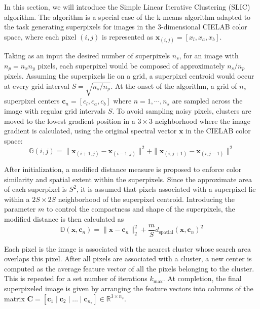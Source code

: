 In this section, we will introduce the Simple Linear Iterative Clustering (SLIC) algorithm. The algorithm is a special case of the k-means algorithm adapted to the task generating superpixels for images in the 3-dimensional CIELAB color space, where each pixel $(i,j)$ is represented as $\mathbf{x}_{(i,j)} = [x_l, x_a, x_b]$.

Taking as an input the desired number of superpixels $n_s$, for an image with $n_p = n_x n_y$ pixels, each superpixel would be composed of approximately $n_s / n_p$ pixels. Assuming the superpixels lie on a grid, a superpixel centroid would occur at every grid interval $S = \sqrt{n_s/n_p}$. At the onset of the algorithm, a grid of $n_s$ superpixel centers $\mathbf{c}_n = [c_{l}, c_{a}, c_{b}]$ where $n = 1, \cdots, n_s$ are sampled across the image with regular grid intervals $S$. To avoid sampling noisy pixels, clusters are moved to the lowest gradient position in a $3 \times 3$ neighborhood where the image gradient is calculated, using the original spectral vector $\mathbf{x}$ in the CIELAB color space:
\begin{equation}
    \label{eq:slic-gradient}
    \mathbb{G}(i,j) = \|\mathbf{x}_{(i+1,j)} - \mathbf{x}_{(i-1,j)} \|^2 + \|\mathbf{x}_{(i,j+1)} - \mathbf{x}_{(i,j-1)} \|^2 
\end{equation}

After initialization, a modified distance measure is proposed to enforce color similarity and spatial extent within the superpixels. Since the approximate area of each superpixel is $S^2$, it is assumed that pixels associated with a superpixel lie within a $2S \times 2S$ neighborhood of the superpixel centroid. Introducing the parameter $m$ to control the compactness and shape of the superpixels, the modified distance is then calculated as 
\begin{equation}
    \label{eq:slic-cielab-distance}
    \mathbb{D}(\mathbf{x}, \mathbf{c}_n) = \|\mathbf{x} - \mathbf{c}_n\|_2^2 + \frac{m}{S}d_{\text{spatial}}(\mathbf{x}, \mathbf{c}_n)^2 
\end{equation}

Each pixel is the image is associated with the nearest cluster whose search area overlaps this pixel. After all pixels are associated with a cluster, a new center is computed as the average feature vector of all the pixels belonging to the cluster. This is repeated for a set number of iterations $k_\text{max}$. At completion, the final superpixeled image is given by arranging the feature vectors into columns of the matrix $\mathbf{C} = [\mathbf{c}_1 \; | \;\mathbf{c}_2 \;| \;\dots \;|\; \mathbf{c}_{n_s}] \in \mathbb{R}^{3 \times n_s}$. 

